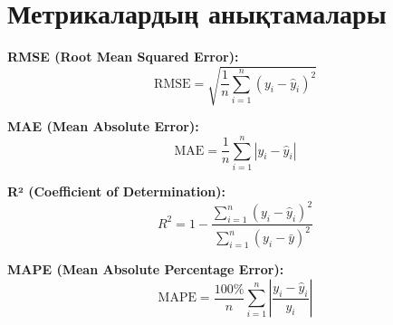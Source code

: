 \documentclass[12pt,a4paper]{article}
\begin{document}
\section{Метрикалардың анықтамалары}

\textbf{RMSE (Root Mean Squared Error):}
\begin{equation}
\text{RMSE} = \sqrt{\frac{1}{n}\sum_{i=1}^{n}(y_i - \hat{y}_i)^2}
\end{equation}

\textbf{MAE (Mean Absolute Error):}
\begin{equation}
\text{MAE} = \frac{1}{n}\sum_{i=1}^{n}|y_i - \hat{y}_i|
\end{equation}

\textbf{R² (Coefficient of Determination):}
\begin{equation}
R^2 = 1 - \frac{\sum_{i=1}^{n}(y_i - \hat{y}_i)^2}{\sum_{i=1}^{n}(y_i - \bar{y})^2}
\end{equation}

\textbf{MAPE (Mean Absolute Percentage Error):}
\begin{equation}
\text{MAPE} = \frac{100\%}{n}\sum_{i=1}^{n}\left|\frac{y_i - \hat{y}_i}{y_i}\right|
\end{equation}
\end{document}
